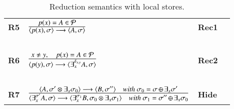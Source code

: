 \documentclass[main.tex]{subfiles}
\begin{document}
\begin{table}
\begin{center}
{\begin{tabular}{llll}
					\mbox{\bf R5}&$\frac {\displaystyle p(x) = A \in  \mathcal{P} }
					{\displaystyle\langle p(x),\sigma\rangle \longrightarrow \langle  A, \sigma\rangle}$ 
					&\bf{Rec1}&
					\\
					&\mbox{   } &\mbox{   }
					\\					
					\mbox{\bf R6}&$\frac {\displaystyle x \neq y, \quad \displaystyle p(x) = A \in  \mathcal{P} }
					{\displaystyle\langle p(y),\sigma\rangle \longrightarrow \langle \exists_x^{\delta_{x,y}} A, \sigma\rangle}$ 
					&\bf{Rec2}&
					\\
					&\mbox{   } &\mbox{   }
					\\						

				\mbox{\bf R7}&$\frac {\displaystyle \langle A, \sigma' \otimes \exists_x \sigma_0
					\rangle \rrarrow \langle B, \sigma'' \rangle \ \ \ \mbox{  \textit{with}  } \sigma_0 = \sigma \odiv \exists_x \sigma'} 
				{\displaystyle\langle \exists^{\sigma'}_x A,
					\sigma \rangle \rrarrow \langle \exists^{\sigma_1}_x B, \sigma_0 \otimes \exists_x \sigma_1\rangle \ \ \ \mbox{  \textit{with}  } \sigma_1 = \sigma'' \odiv \exists_x \sigma_0}$
				&\bf{Hide} &
			\end{tabular} }
	\end{center}
	\caption{Reduction semantics with local stores.}
	\label{fig:operationallocal}
\end{table}
\def\odiv{\, {\ominus\hspace{-6.8pt} \div} \,}
\def\odivvv{\; {\ominus\hspace{-4.7pt} \div} \;}
\end{document}
